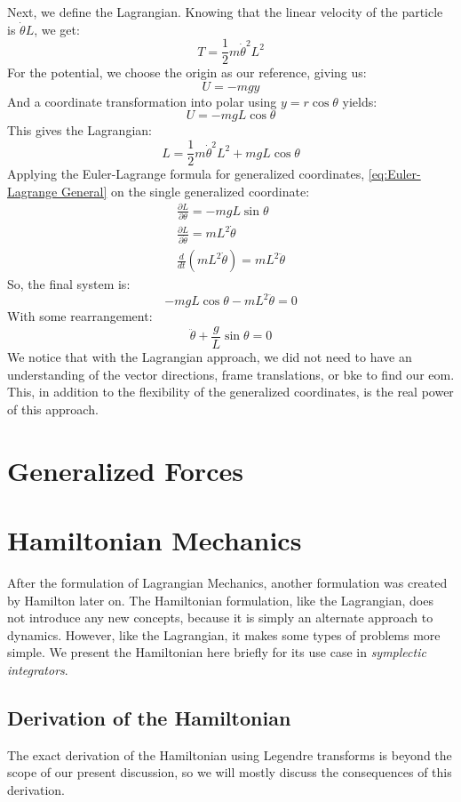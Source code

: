 \documentclass[12pt]{report}
\begin{document}
Next, we define the \gls{Lagrangian}. Knowing that the linear velocity of the particle is $\dot{\theta}L$, we get:
$$T=\frac{1}{2}m\dot{\theta}^2L^2$$
For the potential, we choose the origin as our reference, giving us:
$$U=-mgy$$
And a coordinate transformation into polar using $y=r\cos\theta$ yields:
$$U=-mgL\cos\theta$$
This gives the \gls{Lagrangian}:
$$L=\frac{1}{2}m\dot{\theta}^2L^2+mgL\cos\theta$$
Applying the Euler-Lagrange formula for generalized coordinates, \eqref{eq:Euler-Lagrange General} on the single generalized coordinate:
\begin{gather}
    \frac{\partial L}{\partial \theta}=-mgL\sin\theta\\
    \frac{\partial L}{\partial \dot{\theta}}=mL^2\dot{\theta}\\
    \frac{d}{dt}\left(mL^2\dot{\theta}\right)=mL^2\ddot{\theta}
\end{gather}
So, the final system is:
$$-mgL\cos\theta -mL^2\ddot{\theta}=0$$
With some rearrangement:
$$\ddot{\theta}+\frac{g}{L}\sin\theta=0$$
We notice that with the \gls{Lagrangian} approach, we did not need to have an understanding of the vector directions, frame translations, or \gls{bke} to find our \gls{eom}. This, in addition to the flexibility of the generalized coordinates, is the real power of this approach.

\section{Generalized Forces}

\section{Hamiltonian Mechanics}
After the formulation of \gls{Lagrangian} Mechanics, another formulation was created by Hamilton later on. The Hamiltonian formulation, like the \gls{Lagrangian}, does not introduce any new concepts, because it is simply an alternate approach to dynamics. However, like the \gls{Lagrangian}, it makes some types of problems more simple. We present the Hamiltonian here briefly for its use case in \textit{symplectic integrators}.
\subsection{Derivation of the Hamiltonian}
The exact derivation of the Hamiltonian using Legendre transforms is beyond the scope of our present discussion, so we will mostly discuss the consequences of this derivation. 
\end{document}
